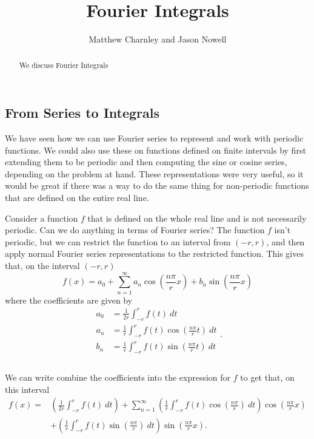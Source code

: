 \documentclass{ximera}
\title{Fourier Integrals}
\author{Matthew Charnley and Jason Nowell}
\begin{document}
\begin{abstract}
    We discuss Fourier Integrals
\end{abstract}
\maketitle


\label{fourierInt:section}


\subsection{From Series to Integrals}

We have seen how we can use Fourier series to represent and work with periodic functions. We could also use these on functions defined on finite intervals by first extending them to be periodic and then computing the sine or cosine series, depending on the problem at hand. These representations were very useful, so it would be great if there was a way to do the same thing for non-periodic functions that are defined on the entire real line. 

Consider a function $f$ that is defined on the whole real line and is not necessarily periodic. Can we do anything in terms of Fourier series? The function $f$ isn't periodic, but we can restrict the function to an interval from $(-r, r)$, and then apply normal Fourier series representations to the restricted function. This gives that, on the interval $(-r, r)$
\[ 
    f(x) = a_0 + \sum_{n=1}^\infty a_n \cos\left(\frac{n\pi}{r}x\right) + b_n \sin\left(\frac{n\pi}{r}x\right) 
\] 
where the coefficients are given by
\[ 
    \begin{split}
        a_0 &= \frac{1}{2r} \int_{-r}^{r} f(t)\ dt\\ 
        a_n &= \frac{1}{r} \int_{-r}^r f(t) \cos\left(\frac{n\pi}{r} t\right)\ dt \\
        b_n &= \frac{1}{r} \int_{-r}^r f(t) \sin\left(\frac{n\pi}{r} t\right)\ dt \\\\
    \end{split}.
\] 

We can write combine the coefficients into the expression for $f$ to get that, on this interval
\[ 
    \begin{split} 
        f(x) =&  \left( \frac{1}{2r} \int_{-r}^{r} f(t)\ dt \right)  + \sum_{n=1}^\infty \left(\frac{1}{r} \int_{-r}^r f(t) \cos\left(\frac{n\pi}{r}\right)\ dt\right) \cos\left(\frac{n\pi}{r}x\right)  \\
        &+ \left(\frac{1}{r} \int_{-r}^r f(t) \sin\left(\frac{n\pi}{r}\right)\ dt\right) \sin\left(\frac{n\pi}{r}x\right).
    \end{split} 
\]
\end{document}
